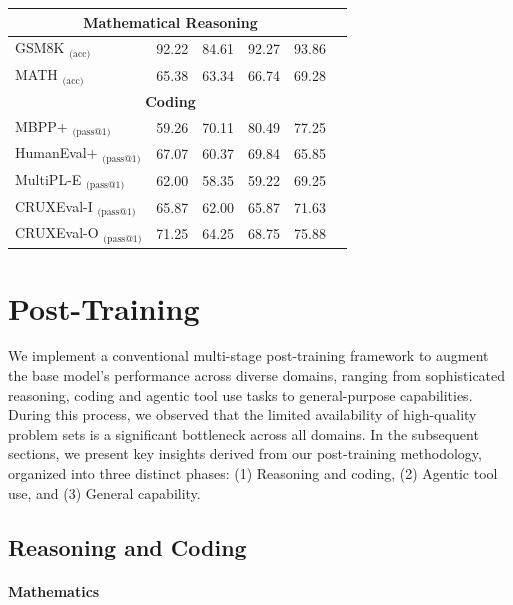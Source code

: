 \documentclass{article}
\begin{document}
\begin{table}[htbp]
{\begin{tabular}{l|ccc|cc}
        \midrule
        \multicolumn{5}{c}{\textbf{Mathematical Reasoning}} \\
        \midrule

        GSM8K $_{\text{(acc)}}$ & 92.22 & 84.61 & 92.27  & 93.86 \\
        MATH $_{\text{(acc)}}$ & 65.38 & 63.34 & 66.74 & 69.28 \\
        \midrule
        \multicolumn{5}{c}{\textbf{Coding}} \\
        \midrule
        MBPP+ $_{\text{(pass@1)}}$ & 59.26 & 70.11 & 80.49  & 77.25 \\
        HumanEval+ $_{\text{(pass@1)}}$  & 67.07 & 60.37  & 69.84  & 65.85 \\
        MultiPL-E $_{\text{(pass@1)}}$ & 62.00 & 58.35 & 59.22  & 69.25 \\
        CRUXEval-I $_{\text{(pass@1)}}$ & 65.87 & 62.00 & 65.87  & 71.63  \\
        CRUXEval-O $_{\text{(pass@1)}}$ & 71.25 & 64.25 & 68.75  & 75.88 \\
        \bottomrule
    \end{tabular}
    }
    
    \label{tab:base_model_results}
\end{table}
 
\section{Post-Training}

We implement a conventional multi-stage post-training framework to augment the base model's performance across diverse domains, ranging from sophisticated reasoning, coding and agentic tool use tasks to general-purpose capabilities. During this process, we observed that the limited availability of high-quality problem sets is a significant bottleneck across all domains. In the subsequent sections, we present key insights derived from our post-training methodology, organized into three distinct phases: (1) Reasoning and coding, (2) Agentic tool use, and (3) General capability.

\subsection{Reasoning and Coding}
\paragraph{Mathematics}
\end{document}
